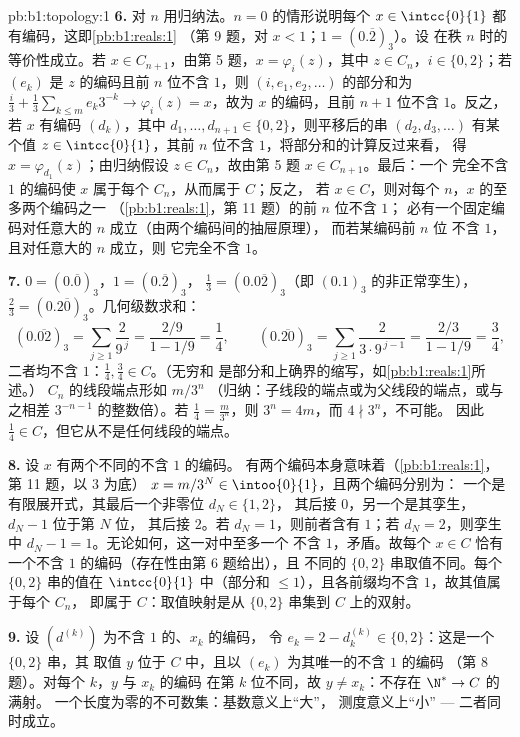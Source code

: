 \begin{solution}{pb:b1:topology:1}
\textbf{6.} 对 $n$ 用归纳法。$n = 0$ 的情形说明每个 $x \in
\intcc{0}{1}$ 都有编码，这即\cref{pb:b1:reals:1}
（第 9 题，对 $x < 1$；$1 = (0.\overline 2)_3$）。设
在秩 $n$ 时的等价性成立。若 $x \in C_{n+1}$，由第 5 题，$x =
\varphi_i(z)$，其中 $z \in C_n$，$i \in \{0, 2\}$；若 $(e_k)$
是 $z$ 的编码且前 $n$ 位不含 $1$，则 $(i, e_1,
e_2, \dots)$ 的部分和为 $\frac i3 + \frac13\sum_{k\leq m}
e_k 3^{-k} \to \varphi_i(z) = x$，故为 $x$ 的编码，且前 $n +
1$ 位不含 $1$。反之，若 $x$ 有编码 $(d_k)$，其中
$d_1, \dots, d_{n+1} \in \{0, 2\}$，则平移后的串 $(d_2,
d_3, \dots)$ 有某个值 $z \in \intcc{0}{1}$，其前 $n$
位不含 $1$，将部分和的计算反过来看，
得 $x = \varphi_{d_1}(z)$；由归纳假设 $z \in
C_n$，故由第 5 题 $x \in C_{n+1}$。最后：一个
完全不含 $1$ 的编码使 $x$ 属于每个 $C_n$，从而属于 $C$；反之，
若 $x \in C$，则对每个 $n$，$x$ 的至多两个编码之一
（\cref{pb:b1:reals:1}，第 11 题）的前 $n$ 位不含 $1$；
必有一个固定编码对任意大的 $n$ 成立（由两个编码间的抽屉原理），
而若某编码前 $n$ 位
不含 $1$，且对任意大的 $n$ 成立，则
它完全不含 $1$。

\textbf{7.} $0 = (0.\overline 0)_3$，$1 = (0.\overline 2)_3$，
$\frac13 = (0.0\overline{2})_3$（即 $(0.1)_3$ 的非正常孪生），
$\frac23 = (0.2\overline{0})_3$。几何级数求和：
\[
(0.\overline{02})_3 = \sum_{j\geq1} \frac{2}{9^{\,j}}
= \frac{2/9}{1 - 1/9} = \frac14 ,
\qquad
(0.\overline{20})_3 = \sum_{j\geq1} \frac{2}{3\cdot 9^{\,j-1}}
= \frac{2/3}{1 - 1/9} = \frac34 ,
\]
二者均不含 $1$：$\frac14, \frac34 \in C$。（无穷和
是部分和上确界的缩写，如\cref{pb:b1:reals:1}所述。）
$C_n$ 的线段端点形如 $m/3^n$
（归纳：子线段的端点或为父线段的端点，或与之相差
$3^{-n-1}$ 的整数倍）。若 $\frac14 =
\frac{m}{3^n}$，则 $3^n = 4m$，而 $4 \nmid 3^n$，不可能。
因此 $\frac14 \in C$，但它从不是任何线段的端点。

\textbf{8.} 设 $x$ 有两个不同的不含 $1$ 的编码。
有两个编码本身意味着（\cref{pb:b1:reals:1}，第 11 题，以 $3$ 为底）
$x = m/3^N \in \intoo{0}{1}$，且两个编码分别为：
一个是有限展开式，其最后一个非零位 $d_N \in \{1, 2\}$，
其后接 $0$，另一个是其孪生，$d_N - 1$ 位于第 $N$ 位，
其后接 $2$。若 $d_N = 1$，则前者含有 $1$；若 $d_N
= 2$，则孪生中 $d_N - 1 = 1$。无论如何，这一对中至多一个
不含 $1$，矛盾。故每个 $x \in C$ 恰有
一个不含 $1$ 的编码（存在性由第 6 题给出），且
不同的 $\{0,2\}$ 串取值不同。每个
$\{0,2\}$ 串的值在 $\intcc{0}{1}$ 中（部分和 $\leq
1$），且各前缀均不含 $1$，故其值属于每个 $C_n$，
即属于 $C$：取值映射是从
$\{0,2\}$ 串集到 $C$ 上的双射。

\textbf{9.} 设 $(d^{(k)})$ 为不含 $1$ 的、$x_k$ 的编码，
令 $e_k = 2 - d^{(k)}_k \in \{0, 2\}$：这是一个 $\{0,2\}$ 串，其
取值 $y$ 位于 $C$ 中，且以 $(e_k)$ 为其唯一的不含 $1$ 的编码
（第 8 题）。对每个 $k$，$y$ 与 $x_k$ 的编码
在第 $k$ 位不同，故 $y \neq x_k$：不存在 $\N^* \to C$ 的满射。
一个长度为零的不可数集：基数意义上“大”，
测度意义上“小” --- 二者同时成立。


\end{solution}
